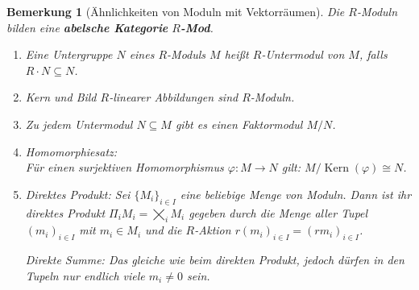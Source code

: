 \documentclass[a4paper,12pt]{scrbook}
\theoremstyle{break}
\newtheorem{Bem}[Def]{Bemerkung}
\theoremstyle{nonumberbreak}
\theoremstyle{nonumberplain}
\newcommand{\emp}[1]{\textbf{\emph{#1}}}
\DeclareMathOperator{\Kern}{Kern}
\begin{document}
\begin{Bem}[Ähnlichkeiten von Moduln mit Vektorräumen]
  Die $R$-Moduln bilden eine \emp{abelsche Kategorie} \emp{$R$-Mod}.
  \begin{enumerate}
    \item Eine Untergruppe $N$ eines $R$-Moduls $M$ heißt $R$-Untermodul von
          $M$, falls $R \cdot N \subseteq N$.
    \item Kern und Bild $R$-linearer Abbildungen sind $R$-Moduln.
    \item Zu jedem Untermodul $N \subseteq M$ gibt es einen Faktormodul $M/N$.
    \item Homomorphiesatz:\\
      Für einen surjektiven Homomorphismus $\varphi: M \rightarrow N$ gilt:
      $M/\Kern(\varphi) \cong N$.
    \item \emph{Direktes Produkt}: Sei ${\{M_{i}\}}_{i \in I}$ eine beliebige
          Menge von Moduln. Dann ist ihr direktes Produkt
     	  $\Pi_i M_i = \bigtimes_i M_i$ gegeben durch die Menge aller Tupel ${(m_i)}_{i
     	  \in I}$ mit $m_i \in M_i$ und die $R$-Aktion ${r(m_i)}_{i \in I} = {(rm_i)}_{i \in I}$.

	  \emph{Direkte Summe}: Das gleiche wie beim direkten Produkt, jedoch dürfen in den 
	  Tupeln nur endlich viele $m_i \neq 0$ sein.
  \end{enumerate}
\end{Bem}
\end{document}
